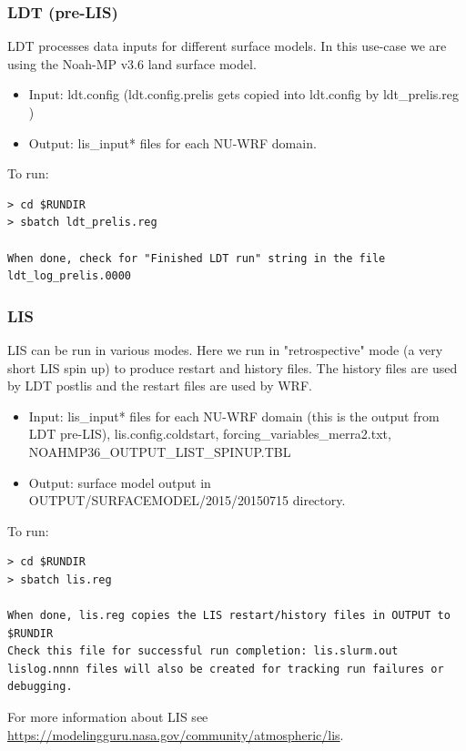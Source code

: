 \begin{frame}[fragile]\frametitle{LDT (pre-LIS)}

\footnotesize{
LDT processes data inputs for different surface models. In this use-case we are using the Noah-MP v3.6 land surface model.
\begin{itemize}
\item Input: ldt.config (ldt.config.prelis gets copied into ldt.config by ldt\_prelis.reg )
\item Output: lis\_input* files for each NU-WRF domain.
\end{itemize}
}    
\hrulefill\par
\footnotesize{To run:}
\begin{lstlisting}
> cd $RUNDIR
> sbatch ldt_prelis.reg

When done, check for "Finished LDT run" string in the file ldt_log_prelis.0000
\end{lstlisting}

\end{frame}

\begin{frame}[fragile]\frametitle{LIS}

\scriptsize{
LIS  can be run in various modes. Here we run in "retrospective" mode (a very short LIS spin up) to produce  restart and history files. The history files are used by LDT postlis and the restart files are used by WRF. 
\begin{itemize}
\item Input:  lis\_input* files for each NU-WRF domain (this is the output from LDT pre-LIS), lis.config.coldstart,  forcing\_variables\_merra2.txt, NOAHMP36\_OUTPUT\_LIST\_SPINUP.TBL 
\item Output: surface model output in OUTPUT/SURFACEMODEL/2015/20150715 directory. 
\end{itemize}
}    
\hrulefill\par
\scriptsize{To run:}
\begin{lstlisting}
> cd $RUNDIR
> sbatch lis.reg

When done, lis.reg copies the LIS restart/history files in OUTPUT to $RUNDIR
Check this file for successful run completion: lis.slurm.out 
lislog.nnnn files will also be created for tracking run failures or debugging.
\end{lstlisting}
\scriptsize{
For more information about LIS see \url{https://modelingguru.nasa.gov/community/atmospheric/lis}.
}
\end{frame}

